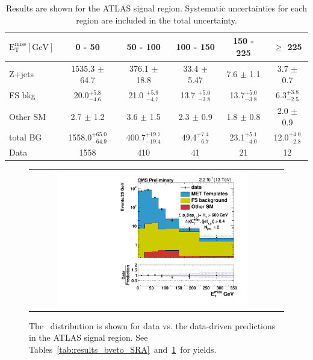 \begin{table}[htb]
\scriptsize
\begin{center}
\caption{\label{tab:results_SR_ATLAS} 
Results are shown for the ATLAS signal region.
Systematic uncertainties for each region are included in the total uncertainty. 
}
\begin{tabular}{l|c|c|c|c|c}
\hline
\hline
$\mathrm{E_{T}^{miss} [GeV]}$ &0 - 50 & 50 - 100 & 100 - 150 & 150 - 225 & $\geq$ 225 \\
\hline 
Z+jets  &  1535.3 $\pm$    64.7 &  376.1 $\pm$     18.8 &  33.4 $\pm$ 5.47     &  7.6 $\pm$      1.1 &  3.7 $\pm$     0.7 \\ 
FS bkg  &    20.0$^{+ 5.8}_{- 4.6}$ &  21.0 $^{+ 5.9}_{- 4.7}$ &  13.7 $^{+ 5.0}_{- 3.8}$ & 13.7$^{+ 5.0}_{- 3.8}$ &  6.3$^{+ 3.8}_{- 2.5}$ \\ 
Other SM&     2.7 $\pm$     1.2 &   3.6 $\pm$       1.5 &   2.3 $\pm$ 0.9      &  1.8 $\pm$      0.8 &  2.0 $\pm$     0.9 \\ 
\hline 
total BG&  1558.0$^{+ 65.0}_{- 64.9}$ &  400.7$^{+ 19.7}_{- 19.4}$ &  49.4$^{+ 7.4}_{- 6.7}$ &  23.1$^{+ 5.1}_{- 4.0}$ &  12.0$^{+ 4.0}_{- 2.8}$ \\ 
\hline 
Data&  1558 &  410 &  41 &  21 &  12 \\ 
\hline
\hline
\end{tabular}
\end{center}
\end{table}


\begin{figure}[!ht]
\begin{center}
\begin{tabular}{cc}
\includegraphics[width=0.8\textwidth]{results/figs/h_met_rawgt1jet_ll_signalregion_rawMET_loosephoton_SR_ATLAS_fsbkg_passtrig.pdf} \\
\end{tabular}
\caption{The \MET\ distribution is shown for data vs. the data-driven predictions in the ATLAS signal region.
See Tables~\ref{tab:results_bveto_SRA}~and~\ref{tab:results_SR_ATLAS}~for yields.
\label{fig:results_SR_ATLAS}
}
\end{center}
\end{figure}

